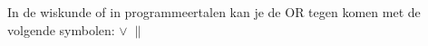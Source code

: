 In de wiskunde of in programmeertalen kan je de OR tegen komen met de volgende symbolen:
\begin{math}
\lor \; \parallel
\end{math}

